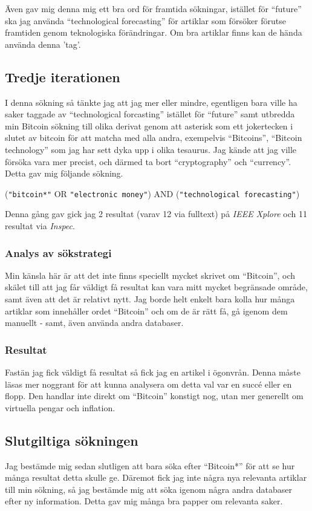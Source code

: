\documentclass[a4paper,11pt,exjobb]{kth-mag}
\begin{document}
Även gav mig denna mig ett bra ord för framtida sökningar, istället för ``future'' ska jag använda ``technological forecasting'' för artiklar som försöker förutse framtiden genom teknologiska förändringar. Om bra artiklar finns kan de hända använda denna 'tag'.

\subsection{Tredje iterationen}
\label{sec:hard}
I denna sökning så tänkte jag att jag mer eller mindre, egentligen bara ville ha saker taggade av ``technological forcasting'' istället för ``future'' samt utbredda min Bitcoin sökning till olika derivat genom att asterisk som ett jokertecken i slutet av bitcoin för att matcha med alla andra, exempelvis ``Bitcoins'', ``Bitcoin technology'' som jag har sett dyka upp i olika tesaurus. Jag kände att jag ville försöka vara mer precist, och därmed ta bort ``cryptography'' och ``currency''.
Detta gav mig följande sökning.
\begin{center}
(\verb#"bitcoin*"# \textsc{OR} \verb#"electronic money"#) \textsc{AND} (\verb#"technological forecasting"#)
\end{center}

Denna gång gav gick jag 2 resultat (varav 12 via fulltext) på \textit{IEEE Xplore} och 11 resultat via \textit{Inspec}.

\subsubsection{Analys av sökstrategi}
Min känsla här är att det inte finns speciellt mycket skrivet om ``Bitcoin'', och skälet till att jag får väldigt få resultat kan vara mitt mycket begränsade område, samt även att det är relativt nytt. Jag borde helt enkelt bara kolla hur många artiklar som innehåller ordet ``Bitcoin'' och om de är rätt få, gå igenom dem manuellt - samt, även använda andra databaser.

\subsubsection{Resultat}
Fastän jag fick väldigt få resultat så fick jag en artikel i ögonvrån\cite{tre}.
Denna måste läsas mer noggrant för att kunna analysera om detta val var en succé eller en flopp. Den handlar inte direkt om ``Bitcoin'' konstigt nog, utan mer generellt om virtuella pengar och inflation.

\subsection{Slutgiltiga sökningen}
\label{sec:database}
Jag bestämde mig sedan slutligen att bara söka efter ``Bitcoin*'' för att se hur många resultat detta skulle ge. 
Däremot fick jag inte några nya relevanta artiklar till min sökning, så jag bestämde mig att söka igenom några andra databaser efter ny information. Detta gav mig många bra papper om relevanta saker.
\end{document}
